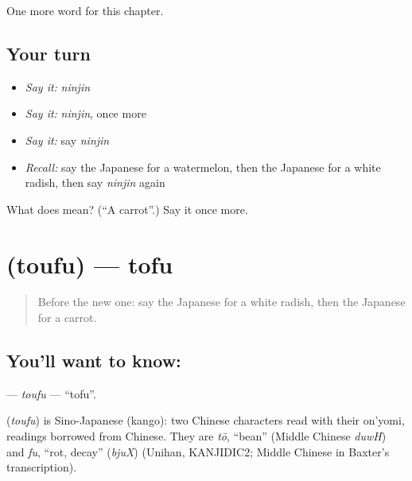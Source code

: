 \begin{grammarlens}[title={What you've built}]
One more word for this chapter.
\end{grammarlens}

\subsection*{Your turn}
\begin{itemize}
\raggedright
  \item \emph{Say it:} \emph{ninjin}
  \item \emph{Say it:} \emph{ninjin}, once more
  \item \emph{Say it:} say \emph{ninjin}
  \item \emph{Recall:} say the Japanese for a watermelon, then the Japanese for a white radish, then say \emph{ninjin} again
\end{itemize}

\begin{tcolorbox}[breakable,colback=teal!4,colframe=teal!35!black,title={Before you move on}]
What does  mean? (\textquotedblleft{}A carrot\textquotedblright{}.) Say it once more.
\end{tcolorbox}
\section[\texorpdfstring{\ja{とうふ} (toufu)}{とうふ (toufu)}]{ (toufu) — tofu}

\label{lesson:JA-C34-toufu}



\begin{quote}
Before the new one: say the Japanese for a white radish, then the Japanese for a carrot.
\end{quote}

\subsection*{You'll want to know: }
\textbf{} — \emph{toufu} — \textquotedblleft{}tofu\textquotedblright{}.

\begin{cousinweb}
\textbf{} (\emph{toufu}) is Sino-Japanese (kango): two Chinese characters read with their on'yomi, readings borrowed from Chinese. They are \emph{tō}, \textquotedblleft{}bean\textquotedblright{} (Middle Chinese \emph{duwH}) and \emph{fu}, \textquotedblleft{}rot, decay\textquotedblright{} (\emph{bjuX}) (Unihan, KANJIDIC2; Middle Chinese in Baxter's transcription).
\end{cousinweb}

